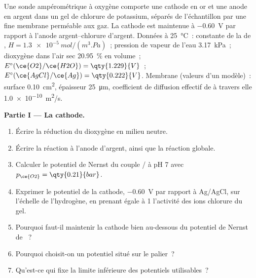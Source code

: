 \begin{problem}
\label{pb:b2:current-potential-curves:1}
Une sonde ampérométrique à oxygène comporte une cathode en or et une anode en argent dans un
gel de chlorure de potassium, séparés de l'échantillon par une fine membrane perméable aux
gaz. La cathode est maintenue à \qty{-0.60}{V} par rapport à l'anode argent--chlorure
d'argent. Données à \qty{25}{\degreeCelsius}~: constante de la  de
, $H = \qty{1.3e-5}{mol/(m^3.Pa)}$~; pression de vapeur de l'eau
\qty{3.17}{kPa}~; dioxygène dans l'air sec 20.95~\% en volume~; $E^\circ(\ce{O2}/\ce{H2O}) =
\qty{1.229}{V}$~; $E^\circ(\ce{AgCl}/\ce{Ag}) = \qty{0.222}{V}$. Membrane (valeurs
d'un modèle)~: surface \qty{0.10}{cm^2}, épaisseur \qty{25}{\micro m}, coefficient de
diffusion effectif de  à travers elle \qty{1.0e-10}{m^2/s}.

\medskip
\noindent\textbf{Partie I --- La cathode.}
\begin{enumerate}
  \item Écrire la réduction du dioxygène en milieu neutre.
  \item Écrire la réaction à l'anode d'argent, ainsi que la réaction globale.
  \item Calculer le potentiel de Nernst du couple / à pH 7 avec
        $p_{\ce{O2}} = \qty{0.21}{bar}$.
  \item Exprimer le potentiel de la cathode, \qty{-0.60}{V} par rapport à Ag/AgCl, sur
        l'échelle de l'hydrogène, en prenant égale à 1 l'activité des ions chlorure du gel.
  \item Pourquoi faut-il maintenir la cathode bien au-dessous du potentiel de Nernst de
        ~?
  \item Pourquoi choisit-on un potentiel situé sur le palier~?
  \item Qu'est-ce qui fixe la limite inférieure des potentiels utilisables~?
\end{enumerate}


\end{problem}
